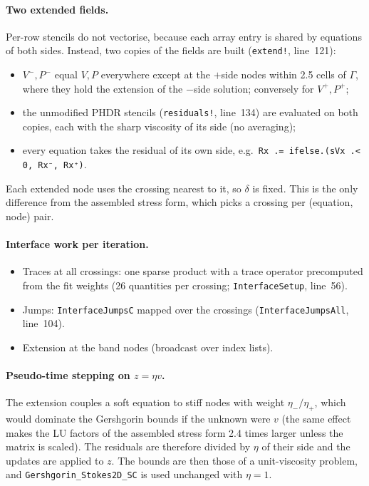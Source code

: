 \documentclass[11pt,a4paper]{article}
\newcommand{\code}[1]{\texttt{#1}}
\begin{document}
\paragraph{Two extended fields.} Per-row stencils do not vectorise, because each array entry is
shared by equations of both sides. Instead, two copies of the fields are built
(\code{extend!}, line~121):
\begin{itemize}
  \item $V^-,P^-$ equal $V,P$ everywhere except at the $+$side nodes within 2.5 cells of
    $\Gamma$, where they hold the extension of the $-$side solution; conversely for $V^+,P^+$;
  \item the unmodified PHDR stencils (\code{residuals!}, line~134) are evaluated on both copies,
    each with the sharp viscosity of its side (no averaging);
  \item every equation takes the residual of its own side, e.g.\
    \code{Rx .= ifelse.(sVx .< 0, Rx⁻, Rx⁺)}.
\end{itemize}
Each extended node uses the crossing nearest to it, so $\delta$ is fixed. This is the only
difference from the assembled stress form, which picks a crossing per (equation, node) pair.

\paragraph{Interface work per iteration.}
\begin{itemize}
  \item Traces at all crossings: one sparse product with a trace operator precomputed from the
    fit weights (26 quantities per crossing; \code{InterfaceSetup}, line~56).
  \item Jumps: \code{InterfaceJumpsC} mapped over the crossings (\code{InterfaceJumpsAll},
    line~104).
  \item Extension at the band nodes (broadcast over index lists).
\end{itemize}

\paragraph{Pseudo-time stepping on $z=\eta v$.} The extension couples a soft equation to stiff
nodes with weight $\eta_-/\eta_+$, which would dominate the Gershgorin bounds if the unknown were
$v$ (the same effect makes the LU factors of the assembled stress form 2.4 times larger unless
the matrix is scaled). The residuals are therefore divided by $\eta$ of their side and the
updates are applied to $z$. The bounds are then those of a unit-viscosity problem, and
\code{Gershgorin\_Stokes2D\_SC} is used unchanged with $\eta=1$.
\end{document}
